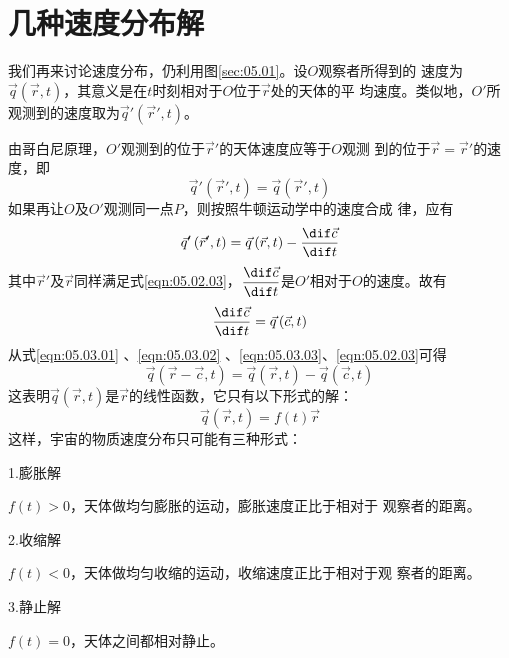 \documentclass[../outline-of-mechanics.tex]{subfiles}
\begin{document}
\section{几种速度分布解}\label{sec:05.03}

我们再来讨论速度分布，仍利用图\ref{sec:05.01}。设$ O $观察者所得到的
速度为$ \vec{ q } \left( \vec{r} , t \right) $，其意义是在$ t $时刻相对于$ O $位于$ \vec{r} $处的天体的平
均速度。类似地，$ O' $所观测到的速度取为$ \vec{ q }' \left( \vec{r} ', t \right) $。

由哥白尼原理，$ O' $观测到的位于$\vec{r}'$的天体速度应等于$ O $观测
到的位于$ \vec{r} = \vec{r}' $的速度，即
\begin{equation}\label{eqn:05.03.01}
  \vec{q} ' \left( \vec{r} ' , t \right) = \vec{q} \left( \vec{r} ' , t \right)
\end{equation}
如果再让$ O $及$ O' $观测同一点$ P $，则按照牛顿运动学中的速度合成
律，应有
\begin{equation}\label{eqn:05.03.02}
  \vec{q} ' \left( \vec{r} ' , t \right) = \vec{q} \left( \vec{r} , t \right) - \frac{ \dif \vec{c} }{\dif t}
\end{equation}
其中$ \vec{r}' $及$ \vec{r} $同样满足式\eqref{eqn:05.02.03}，$ \dfrac{ \dif \vec{c} }{\dif t} $是$ O' $相对于$ O $的速度。故有
\begin{equation}\label{eqn:05.03.03}
  \frac { \dif \vec{c} } { \dif t } = \vec{q} \left( \vec{c} , t \right)
\end{equation}
从式\eqref{eqn:05.03.01} 、\eqref{eqn:05.03.02} 、\eqref{eqn:05.03.03}、\eqref{eqn:05.02.03}可得
\begin{equation}\label{eqn:05.03.04}
  \vec{q} \left( \vec{r} -\vec{c} , t \right) = \vec{q} \left( \vec{r} , t \right) - \vec{q} \left( \vec{c} , t \right)
\end{equation}
这表明$ \vec{q} \left( \vec{r} , t \right) $是$ \vec{r} $的线性函数，它只有以下形式的解：
\begin{equation}\label{eqn:05.03.05}
  \vec{q} \left( \vec{r} , t \right) = f \left(t\right) \vec{r}
\end{equation}
这样，宇宙的物质速度分布只可能有三种形式：

\textsf{1.膨胀解}

$ f \left( t \right) > 0 $，天体做均匀膨胀的运动，膨胀速度正比于相对于
观察者的距离。

\textsf{2.收缩解}

$ f \left( t \right) < 0 $，天体做均匀收缩的运动，收缩速度正比于相对于观
察者的距离。

\clearpage
\textsf{3.静止解}

$ f \left( t \right) = 0 $，天体之间都相对静止。
\end{document}
